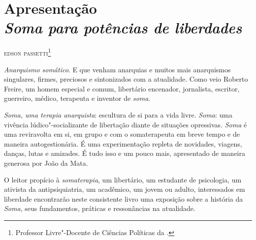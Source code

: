 


\chapter*{Apresentação\\ \emph{\emph{Soma} para potências de liberdades}}

\begin{flushright}
\textsc{edson passetti}\footnote{Professor Livre"-Docente de Ciências Políticas da .}
\end{flushright}

\emph{Anarquismo somático}. E que venham anarquias e muitos mais
anarquismos singulares, firmes, preciosos e sintonizados com a
atualidade. Como veio Roberto Freire, um homem especial e comum,
libertário encenador, jornalista, escritor, guerreiro, médico, terapeuta
e inventor de \emph{soma}.

\emph{Soma, uma terapia anarquista}: escultura de si para a vida livre.
\emph{Soma}: uma vivência lúdico"-socializante de libertação diante de
situações opressivas. \emph{Soma} é uma reviravolta em si, em grupo e
com o somaterapeuta em breve tempo e de maneira autogestionária. É uma
experimentação repleta de novidades, viagens, danças, lutas e amizades.
É tudo isso e um pouco mais, apresentado de maneira generosa por João da
Mata.

O leitor propício à \emph{somaterapia}, um libertário, um estudante de
psicologia, um ativista da antipsiquiatria, um acadêmico, um jovem ou
adulto, interessados em liberdade encontrarão neste consistente livro
uma exposição sobre a história da \emph{Soma}, seus fundamentos,
práticas e ressonâncias na atualidade.

